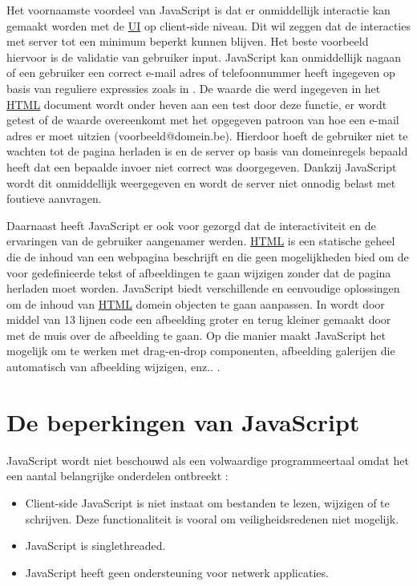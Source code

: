 	Het voornaamste voordeel van JavaScript is dat er onmiddellijk interactie kan gemaakt worden met de \hyperref[ui]{UI} op client-side niveau. Dit wil zeggen dat de interacties met server tot een minimum beperkt kunnen blijven. Het beste voorbeeld hiervoor is de validatie van gebruiker input. JavaScript kan onmiddellijk nagaan of een gebruiker een correct e-mail adres of telefoonnummer heeft ingegeven op basis van reguliere expressies zoals in . De waarde die werd ingegeven in het \hyperref[html]{HTML} document wordt onder heven aan een test door deze functie, er wordt getest of de waarde overeenkomt met het opgegeven patroon van hoe een e-mail adres er moet uitzien (voorbeeld@domein.be). Hierdoor hoeft de gebruiker niet te wachten tot de pagina herladen is en de server op basis van domeinregels bepaald heeft dat een bepaalde invoer niet correct was doorgegeven. Dankzij JavaScript wordt dit onmiddellijk weergegeven en wordt de server niet onnodig belast met foutieve aanvragen.

	Daarnaast heeft JavaScript er ook voor gezorgd dat de interactiviteit en de ervaringen van de gebruiker aangenamer werden. \hyperref[html]{HTML} is een statische geheel die de inhoud van een webpagina beschrijft en die geen mogelijkheden bied om de voor gedefinieerde tekst of afbeeldingen te gaan wijzigen zonder dat de pagina herladen moet worden. JavaScript biedt verschillende en eenvoudige oplossingen om de inhoud van \hyperref[html]{HTML} domein objecten te gaan aanpassen. \citep{vijaywebsolutions:Javascript}
	In  wordt door middel van 13 lijnen code een afbeelding groter en terug kleiner gemaakt door met de muis over de afbeelding te gaan. Op die manier maakt JavaScript het mogelijk om te werken met drag-en-drop componenten, afbeelding galerijen die automatisch van afbeelding wijzigen, enz.. .

\section{De beperkingen van JavaScript}
JavaScript wordt niet beschouwd als een volwaardige programmeertaal omdat het een aantal belangrijke onderdelen ontbreekt : 
	\begin{itemize}
		\item Client-side JavaScript is niet instaat om bestanden te lezen, wijzigen of te schrijven. Deze functionaliteit is vooral om veiligheidsredenen niet mogelijk.
		\item JavaScript is singlethreaded.
		\item JavaScript heeft geen ondersteuning voor netwerk applicaties.
	\end{itemize} 

